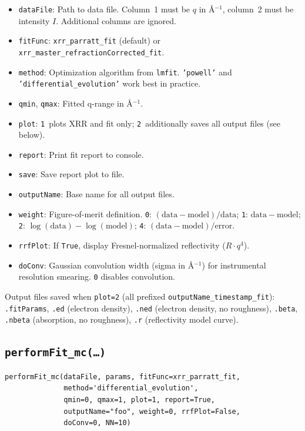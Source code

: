 \documentclass[11pt,a4paper]{article}
\begin{document}
\begin{itemize}[leftmargin=1.5em]
  \item \texttt{dataFile}: Path to data file. Column~1 must be $q$ in \AA$^{-1}$,
        column~2 must be intensity $I$. Additional columns are ignored.
  \item \texttt{fitFunc}: \texttt{xrr\_parratt\_fit} (default) or
        \texttt{xrr\_master\_refractionCorrected\_fit}.
  \item \texttt{method}: Optimization algorithm from \texttt{lmfit}.
        \texttt{'powell'} and \texttt{'differential\_evolution'} work best in practice.
  \item \texttt{qmin}, \texttt{qmax}: Fitted q-range in \AA$^{-1}$.
  \item \texttt{plot}: \texttt{1}~plots XRR and fit only; \texttt{2}~additionally saves
        all output files (see below).
  \item \texttt{report}: Print fit report to console.
  \item \texttt{save}: Save report plot to file.
  \item \texttt{outputName}: Base name for all output files.
  \item \texttt{weight}: Figure-of-merit definition.
        \texttt{0}: $(\mathrm{data}-\mathrm{model})/\mathrm{data}$;
        \texttt{1}: $\mathrm{data}-\mathrm{model}$;
        \texttt{2}: $\log(\mathrm{data})-\log(\mathrm{model})$;
        \texttt{4}: $(\mathrm{data}-\mathrm{model})/\mathrm{error}$.
  \item \texttt{rrfPlot}: If \texttt{True}, display Fresnel-normalized reflectivity
        ($R \cdot q^4$).
  \item \texttt{doConv}: Gaussian convolution width (sigma in \AA$^{-1}$) for instrumental
        resolution smearing. \texttt{0} disables convolution.
\end{itemize}

Output files saved when \texttt{plot=2} (all prefixed \texttt{outputName\_timestamp\_fit}):
\texttt{.fitParams},
\texttt{.ed} (electron density),
\texttt{.ned} (electron density, no roughness),
\texttt{.beta},
\texttt{.nbeta} (absorption, no roughness),
\texttt{.r} (reflectivity model curve).

\subsection*{\texttt{performFit\_mc(\ldots)}}

\begin{verbatim}
performFit_mc(dataFile, params, fitFunc=xrr_parratt_fit,
              method='differential_evolution',
              qmin=0, qmax=1, plot=1, report=True,
              outputName="foo", weight=0, rrfPlot=False,
              doConv=0, NN=10)
\end{verbatim}
\end{document}

